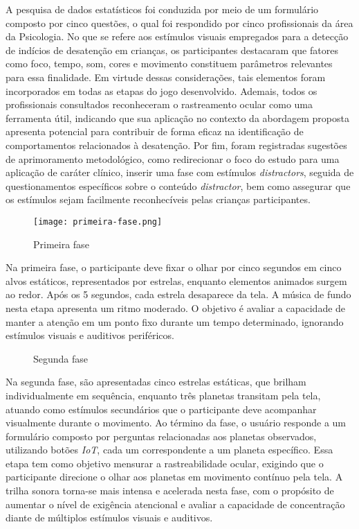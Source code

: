 A pesquisa de dados estatísticos foi conduzida por meio de um formulário composto por cinco questões, o qual foi respondido por cinco profissionais da área da Psicologia. No que se refere aos estímulos visuais empregados para a detecção de indícios de desatenção em crianças, os participantes destacaram que fatores como foco, tempo, som, cores e movimento constituem parâmetros relevantes para essa finalidade. Em virtude dessas considerações, tais elementos foram incorporados em todas as etapas do jogo desenvolvido. Ademais, todos os profissionais consultados reconheceram o rastreamento ocular como uma ferramenta útil, indicando que sua aplicação no contexto da abordagem proposta apresenta potencial para contribuir de forma eficaz na identificação de comportamentos relacionados à desatenção. Por fim, foram registradas sugestões de aprimoramento metodológico, como redirecionar o foco do estudo para uma aplicação de caráter clínico, inserir uma fase com estímulos \textit{distractors}, seguida de questionamentos específicos sobre o conteúdo \textit{distractor}, bem como assegurar que os estímulos sejam facilmente reconhecíveis pelas crianças participantes.

\begin{figure}[H]
    \centering
    \caption{Primeira fase}%
    \label{fig:primeira-fase}
    \texttt{[image: primeira-fase.png]}%
\end{figure}

Na primeira fase, o participante deve fixar o olhar por cinco segundos em cinco alvos estáticos,
representados por estrelas, enquanto elementos animados surgem ao redor. Após os 5 segundos,
cada estrela desaparece da tela. A música de fundo nesta etapa apresenta um ritmo moderado. O
objetivo é avaliar a capacidade de manter a atenção em um ponto fixo durante um tempo determinado, ignorando estímulos visuais e auditivos periféricos.

\begin{figure}[H]
    \centering
    \caption{Segunda fase}%
    \label{fig:segunda-fase}
\end{figure}

Na segunda fase, são apresentadas cinco estrelas estáticas, que brilham individualmente em sequência, enquanto três planetas transitam pela tela, atuando como estímulos secundários que o participante deve acompanhar visualmente durante o movimento. Ao término da fase, o usuário responde a um formulário composto por perguntas relacionadas aos planetas observados, utilizando botões \textit{IoT}, cada um correspondente a um planeta específico. Essa etapa tem como objetivo mensurar a rastreabilidade ocular, exigindo que o participante direcione o olhar aos planetas em movimento contínuo pela tela. A trilha sonora torna-se mais intensa e acelerada nesta fase, com o propósito de aumentar o nível de exigência atencional e avaliar a capacidade de concentração diante de múltiplos estímulos visuais e auditivos.

